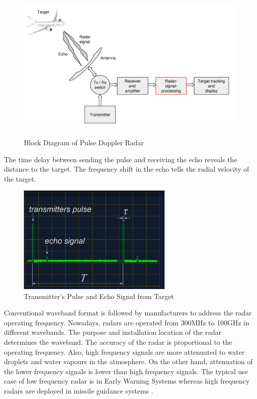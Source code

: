 \begin{figure}[h!]
	\centering
	\includegraphics[width=130mm, height=75mm]{figures/radar_principle}
	\caption{Block Diagram of Pulse Doppler Radar \cite{Ludl}}
	\label{fig:intro:radar:blockdia}
\end{figure}

The time delay between sending the pulse and receiving the echo reveals the distance to the target. The frequency shift in the echo tells the radial velocity of the target.
\begin{figure}[h!]
	\centering
	\includegraphics[width=75mm]{figures/trRx}
	\caption{Transmitter's Pulse and Echo Signal from Target \cite{radarTut}}
	\label{fig:intro:radar:txrx}
\end{figure}

Conventional waveband format is followed by manufacturers to address the radar operating frequency. Nowadays, radars are operated from 300MHz to 100GHz in different wavebands. The purpose and installation location of the radar determines the waveband. The accuracy of the radar is proportional to the operating frequency. Also, high frequency signals are more attenuated to water droplets and water vapours in the atmosphere. On the other hand, attenuation of the lower frequency signals is lower than high frequency signals. The typical use case of low frequency radar is in Early Warning Systems whereas high frequency radars are deployed in missile guidance systems \cite{radarExample}.


